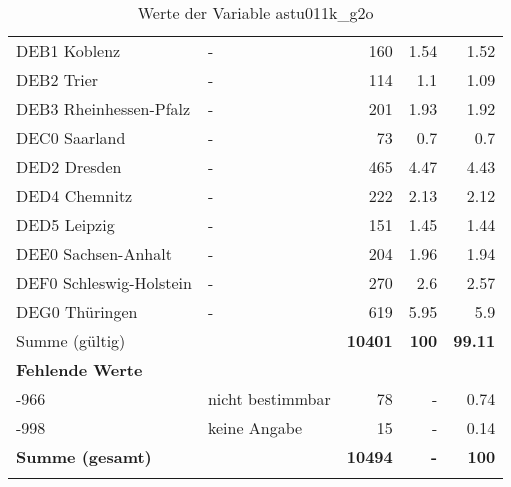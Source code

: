 \begin{longtable}{Xlrrr}
        \multicolumn{1}{X}{DEB1 Koblenz} & - & \num{160} & \num[round-mode=places,round-precision=2]{1.54} & \num[round-mode=places,round-precision=2]{1.52} \\
        \multicolumn{1}{X}{DEB2 Trier} & - & \num{114} & \num[round-mode=places,round-precision=2]{1.1} & \num[round-mode=places,round-precision=2]{1.09} \\
        \multicolumn{1}{X}{DEB3 Rheinhessen-Pfalz} & - & \num{201} & \num[round-mode=places,round-precision=2]{1.93} & \num[round-mode=places,round-precision=2]{1.92} \\
        \multicolumn{1}{X}{DEC0 Saarland} & - & \num{73} & \num[round-mode=places,round-precision=2]{0.7} & \num[round-mode=places,round-precision=2]{0.7} \\
        \multicolumn{1}{X}{DED2 Dresden} & - & \num{465} & \num[round-mode=places,round-precision=2]{4.47} & \num[round-mode=places,round-precision=2]{4.43} \\
        \multicolumn{1}{X}{DED4 Chemnitz} & - & \num{222} & \num[round-mode=places,round-precision=2]{2.13} & \num[round-mode=places,round-precision=2]{2.12} \\
        \multicolumn{1}{X}{DED5 Leipzig} & - & \num{151} & \num[round-mode=places,round-precision=2]{1.45} & \num[round-mode=places,round-precision=2]{1.44} \\
        \multicolumn{1}{X}{DEE0 Sachsen-Anhalt} & - & \num{204} & \num[round-mode=places,round-precision=2]{1.96} & \num[round-mode=places,round-precision=2]{1.94} \\
        \multicolumn{1}{X}{DEF0 Schleswig-Holstein} & - & \num{270} & \num[round-mode=places,round-precision=2]{2.6} & \num[round-mode=places,round-precision=2]{2.57} \\
        \multicolumn{1}{X}{DEG0 Thüringen} & - & \num{619} & \num[round-mode=places,round-precision=2]{5.95} & \num[round-mode=places,round-precision=2]{5.9} \\
     \midrule
      \multicolumn{2}{l}{Summe (gültig)} & \textbf{\num{10401}} &
      \textbf{\num{100}} &
         \textbf{\num[round-mode=places,round-precision=2]{99.11}} \\
     \multicolumn{5}{l}{\textbf{Fehlende Werte}}\\
       -966 & nicht bestimmbar & \num{78} & - & \num[round-mode=places,round-precision=2]{0.74} \\

       -998 & keine Angabe & \num{15} & - & \num[round-mode=places,round-precision=2]{0.14} \\

     \midrule
     \multicolumn{2}{l}{\textbf{Summe (gesamt)}} & \textbf{\num{10494}} & \textbf{-} & \textbf{\num{100}} \\
     \bottomrule
     \caption{Werte der Variable astu011k\_g2o}
     \end{longtable}
     
